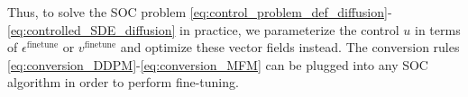\documentclass[]{fairmeta}
\begin{document}
Thus, to solve the SOC problem \eqref{eq:control_problem_def_diffusion}-\eqref{eq:controlled_SDE_diffusion} in practice, we parameterize the control $u$ in terms of $\epsilon^{\mathrm{finetune}}$ or $v^{\mathrm{finetune}}$ and optimize these vector fields instead. The conversion rules \eqref{eq:conversion_DDPM}-\eqref{eq:conversion_MFM} can be plugged into any SOC algorithm in order to perform fine-tuning. 


\end{document}
